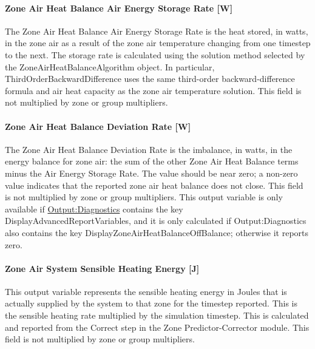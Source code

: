 \paragraph{Zone Air Heat Balance Air Energy Storage Rate {[}W{]}}\label{zone-air-heat-balance-air-energy-storage-rate-w}

The Zone Air Heat Balance Air Energy Storage Rate is the heat stored, in watts, in the zone air as a result of the zone air temperature changing from one timestep to the next. The storage rate is calculated using the solution method selected by the ZoneAirHeatBalanceAlgorithm object. In particular, \mbox{ThirdOrderBackwardDifference} uses the same third-order backward-difference formula and air heat capacity as the zone air temperature solution. This field is not multiplied by zone or group multipliers.

\paragraph{Zone Air Heat Balance Deviation Rate {[}W{]}}\label{zone-air-heat-balance-deviation-rate-w}

The Zone Air Heat Balance Deviation Rate is the imbalance, in watts, in the energy balance for zone air: the sum of the other Zone Air Heat Balance terms minus the Air Energy Storage Rate. The value should be near zero; a non-zero value indicates that the reported zone air heat balance does not close. This field is not multiplied by zone or group multipliers. This output variable is only available if \hyperref[outputdiagnostics]{Output:Diagnostics} contains the key DisplayAdvancedReportVariables, and it is only calculated if Output:Diagnostics also contains the key DisplayZoneAirHeatBalanceOffBalance; otherwise it reports zero.

\paragraph{Zone Air System Sensible Heating Energy {[}J{]}}\label{zone-air-system-sensible-heating-energy-j}

This output variable represents the sensible heating energy in Joules that is actually supplied by the system to that zone for the timestep reported. This is the sensible heating rate multiplied by the simulation timestep. This is calculated and reported from the Correct step in the Zone Predictor-Corrector module. This field is not multiplied by zone or group multipliers.


